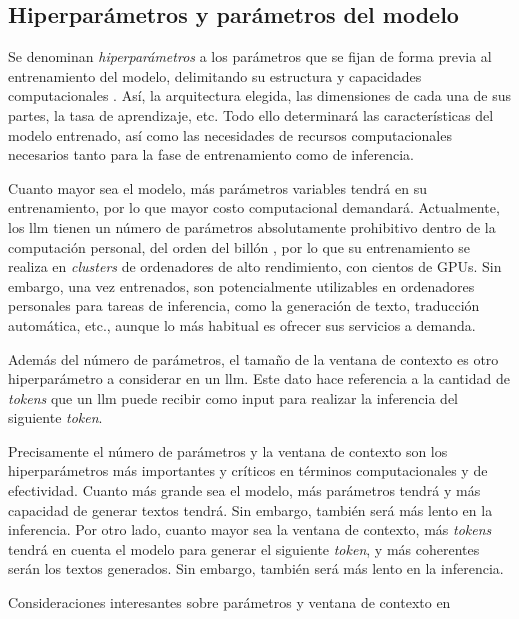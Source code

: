 \subsection{Hiperparámetros y parámetros del modelo}


Se denominan \textit{hiperparámetros} a los parámetros que se fijan de forma previa al entrenamiento del modelo, delimitando su estructura y capacidades computacionales \citep{QueEsAjuste}. Así, la arquitectura elegida, las dimensiones de cada una de sus partes, la tasa de aprendizaje, etc. Todo ello determinará las características del modelo entrenado, así como las necesidades de recursos computacionales necesarios tanto para la fase de entrenamiento como de inferencia.

Cuanto mayor sea el modelo, más parámetros variables tendrá en su entrenamiento, por lo que mayor costo computacional demandará. Actualmente, los \gls{llm} tienen un número de parámetros absolutamente prohibitivo dentro de la computación personal, del orden del billón \citep{radfordLanguageModelsAre2019}, por lo que su entrenamiento se realiza en \textit{clusters} de ordenadores de alto rendimiento, con cientos de GPUs. Sin embargo, una vez entrenados, son potencialmente utilizables en ordenadores personales para tareas de inferencia, como la generación de texto, traducción automática, etc., aunque lo más habitual es ofrecer sus servicios a demanda.

Además del número de parámetros, el tamaño de la ventana de contexto es otro hiperparámetro a considerar en un \gls{llm}. Este dato hace referencia a la cantidad de \textit{tokens} que un \gls{llm} puede recibir como input para realizar la inferencia del siguiente \textit{token}. 





Precisamente el número de parámetros y la ventana de contexto son los hiperparámetros más importantes y críticos en términos computacionales y de efectividad. Cuanto más grande sea el modelo, más parámetros tendrá y más capacidad de generar textos tendrá. Sin embargo, también será más lento en la inferencia. Por otro lado, cuanto mayor sea la ventana de contexto, más \textit{tokens} tendrá en cuenta el modelo para generar el siguiente \textit{token}, y más coherentes serán los textos generados. Sin embargo, también será más lento en la inferencia.


Consideraciones interesantes sobre parámetros y ventana de contexto en \cite{gonzaloAsomandonosVentanaContextual2023}

